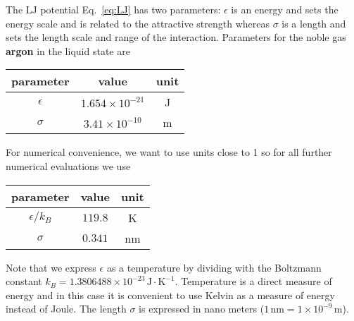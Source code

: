 \documentclass[paper=letter]{scrartcl}
\begin{document}
The LJ potential Eq.~\ref{eq:LJ} has two parameters: $\epsilon$ is an
energy and sets the energy scale and is related to the attractive
strength whereas $\sigma$ is a length and sets the length scale and
range of the interaction. Parameters for the noble gas \textbf{argon}
in the liquid state are

\begin{center}
  \begin{tabular}{ccc}
    \toprule
    parameter & value & unit\\
    \midrule
    $\epsilon$ & $1.654 \times 10^{-21}$ & J\\
    $\sigma$ & $3.41\times 10^{-10}$& m\\
    \bottomrule                        
  \end{tabular}
\end{center}
For numerical convenience, we want to use units close to 1 so for all
further numerical evaluations we use
\begin{center}
  \begin{tabular}{ccc}
    \toprule
    parameter & value & unit\\
    \midrule
    $\epsilon/k_{B}$ & $119.8$ & K\\
    $\sigma$ & $0.341$& nm\\
    \bottomrule                        
  \end{tabular}
\end{center}
Note that we express $\epsilon$ as a temperature by dividing with the
Boltzmann constant
$k_{B} = 1.3806488 \times
10^{-23}\,\text{J}\cdot\text{K}^{-1}$. Temperature is a direct measure
of energy and in this case it is convenient to use Kelvin as a measure
of energy instead of Joule. The length $\sigma$ is expressed in nano
meters ($1\,\text{nm} = 1\times 10^{-9}\,\text{m}$).
\end{document}
